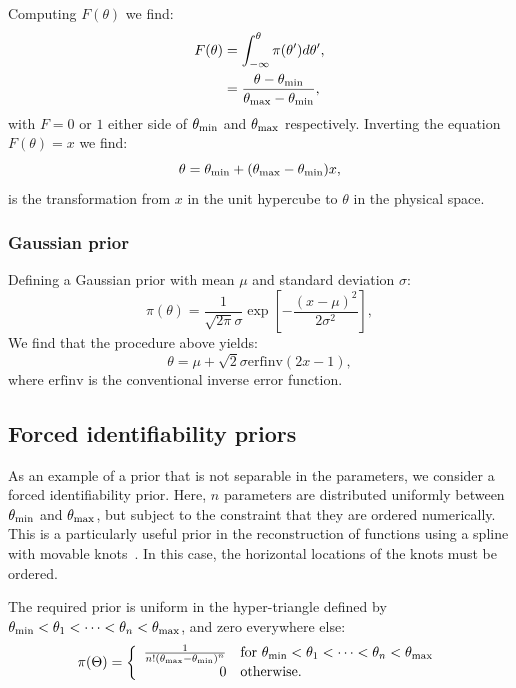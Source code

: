 Computing $F(\theta)$ we find:
\begin{align}
  F(\theta) &= \int_{-\infty}^\theta \pi(\theta')d\theta', \nonumber\\
  &= \frac{\theta-\theta_{\mathrm{min}}}{\theta_{\mathrm{max}}-\theta_{\mathrm{min}}},
  \label{eqn:pc:calc_uniform_trans}
\end{align}
with $F=0$ or $1$ either side of $\theta_{\mathrm{min}}$ and $\theta_{\mathrm{max}}$ respectively. Inverting the equation $F(\theta)=x$ we find:
\begin{equation}
  \theta = \theta_{\mathrm{min}}+(\theta_{\mathrm{max}}-\theta_{\mathrm{min}})x,
  \label{eqn:pc:uniform_trans}                           
\end{equation}
is the transformation from $x$ in the unit hypercube to $\theta$ in the physical space.

\subsubsection{Gaussian prior}
\label{sec:pc:gaussian_prior}
Defining a Gaussian prior with mean $\mu$ and standard deviation $\sigma$:
\begin{equation}
  \pi(\theta) = \frac{1}{\sqrt{2\pi}\sigma}\exp{\left[-\frac{{(x-\mu)}^2}{2\sigma^2}\right]},
  \label{eqn:pc:gaussian_prior}
\end{equation}
We find that the procedure above yields:
\begin{equation}
  \theta = \mu + \sqrt{2}\sigma\text{erfinv}(2x-1),
  \label{eqn:pc:gaussian_trans}                           
\end{equation}
where $\text{erfinv}$ is the conventional inverse error function.




\subsection{Forced identifiability priors}
\label{sec:pc:forced_identifiablility}

As an example of a prior that is not separable in the parameters, we consider a forced identifiability prior. Here, $n$ parameters are distributed uniformly between $\theta_{\mathrm{min}}$ and $\theta_{\mathrm{max}}$, but subject to the constraint that they are ordered numerically. This is a particularly useful prior in the reconstruction of functions using a spline with movable knots~\citep{vazquez_knots,knottedsky1,knottedsky2,planck2015-a24}. In this case, the  horizontal locations of the knots must be ordered.

The required prior is uniform in the hyper-triangle defined by $\theta_{\mathrm{min}}<\theta_1<\cdots<\theta_n<\theta_{\mathrm{max}}$, and zero everywhere else:
%
\begin{equation}
  \pi(\Theta) = 
  \left\{
    \begin{array}{rl}
      \frac{1}{n!{(\theta_{\mathrm{max}} - \theta_{\mathrm{min}})}^{n}} 
      &
      \text{for }\theta_{\mathrm{min}}<\theta_1<\cdots<\theta_n<\theta_{\mathrm{max}} \\
      0 &\text{otherwise.}
    \end{array}
    \right.
\label{eqn:pc:sorted_uniform_prior}
\end{equation}

